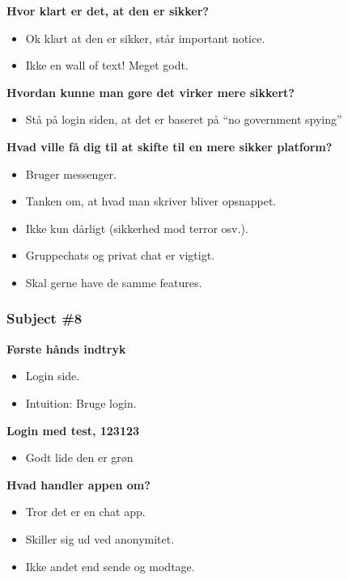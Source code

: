 \noindent\textbf{Hvor klart er det, at den er sikker?}
\begin{itemize}
    \item Ok klart at den er sikker, står important notice. 
    \item Ikke en wall of text! Meget godt.
\end{itemize}

\noindent\textbf{Hvordan kunne man gøre det virker mere sikkert?}
\begin{itemize}
    \item Stå på login siden, at det er baseret på “no government spying” 
\end{itemize}

\noindent\textbf{Hvad ville få dig til at skifte til en mere sikker platform?}
\begin{itemize}
    \item Bruger messenger.
    \item Tanken om, at hvad man skriver bliver opsnappet.
    \item Ikke kun dårligt (sikkerhed mod terror osv.).
    \item Gruppechats og privat chat er vigtigt.
    \item Skal gerne have de samme features.
\end{itemize}

\subsubsection{Subject \#8}

\noindent\textbf{Første hånds indtryk}
\begin{itemize}
    \item Login side.
    \item Intuition: Bruge login.
\end{itemize}

\noindent\textbf{Login med test, 123123}
\begin{itemize}
    \item Godt lide den er grøn
\end{itemize}

\noindent\textbf{Hvad handler appen om?}
\begin{itemize}
    \item Tror det er en chat app.
    \item Skiller sig ud ved anonymitet.
    \item Ikke andet end sende og modtage.
\end{itemize}

